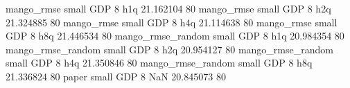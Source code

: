        mango_rmse      small      GDP                 8                  h1q 21.162104 80
       mango_rmse      small      GDP                 8                  h2q 21.324885 80
       mango_rmse      small      GDP                 8                  h4q 21.114638 80
       mango_rmse      small      GDP                 8                  h8q 21.446534 80
mango_rmse_random      small      GDP                 8                  h1q 20.984354 80
mango_rmse_random      small      GDP                 8                  h2q 20.954127 80
mango_rmse_random      small      GDP                 8                  h4q 21.350846 80
mango_rmse_random      small      GDP                 8                  h8q 21.336824 80
            paper      small      GDP                 8                  NaN 20.845073 80